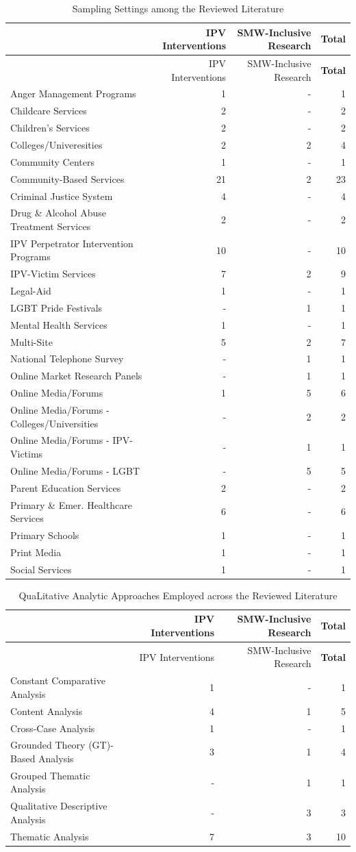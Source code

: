 \documentclass[11pt,]{tufte-book}
\begin{document}
\newpage

\begin{longtable}[]{@{}lrrr@{}}
\caption{Sampling Settings among the Reviewed Literature
\label{tbl:ftmsetp}}\tabularnewline
\toprule
& IPV Interventions & SMW-Inclusive Research &
\textbf{Total}\tabularnewline
\midrule
\endfirsthead
\toprule
& IPV Interventions & SMW-Inclusive Research &
\textbf{Total}\tabularnewline
\midrule
\endhead
Anger Management Programs & 1 & - & 1\tabularnewline
Childcare Services & 2 & - & 2\tabularnewline
Children's Services & 2 & - & 2\tabularnewline
Colleges/Univeresities & 2 & 2 & 4\tabularnewline
Community Centers & 1 & - & 1\tabularnewline
Community-Based Services & 21 & 2 & 23\tabularnewline
Criminal Justice System & 4 & - & 4\tabularnewline
Drug \& Alcohol Abuse Treatment Services & 2 & - & 2\tabularnewline
IPV Perpetrator Intervention Programs & 10 & - & 10\tabularnewline
IPV-Victim Services & 7 & 2 & 9\tabularnewline
Legal-Aid & 1 & - & 1\tabularnewline
LGBT Pride Festivals & - & 1 & 1\tabularnewline
Mental Health Services & 1 & - & 1\tabularnewline
Multi-Site & 5 & 2 & 7\tabularnewline
National Telephone Survey & - & 1 & 1\tabularnewline
Online Market Research Panels & - & 1 & 1\tabularnewline
Online Media/Forums & 1 & 5 & 6\tabularnewline
Online Media/Forums - Colleges/Universities & - & 2 & 2\tabularnewline
Online Media/Forums - IPV-Victims & - & 1 & 1\tabularnewline
Online Media/Forums - LGBT & - & 5 & 5\tabularnewline
Parent Education Services & 2 & - & 2\tabularnewline
Primary \& Emer. Healthcare Services & 6 & - & 6\tabularnewline
Primary Schools & 1 & - & 1\tabularnewline
Print Media & 1 & - & 1\tabularnewline
Social Services & 1 & - & 1\tabularnewline
\bottomrule
\end{longtable}

\newpage

\begin{longtable}[]{@{}lrrr@{}}
\caption{QuaLitative Analytic Approaches Employed across the Reviewed
Literature \label{tbl:aql}}\tabularnewline
\toprule
& IPV Interventions & SMW-Inclusive Research &
\textbf{Total}\tabularnewline
\midrule
\endfirsthead
\toprule
& IPV Interventions & SMW-Inclusive Research &
\textbf{Total}\tabularnewline
\midrule
\endhead
Constant Comparative Analysis & 1 & - & 1\tabularnewline
Content Analysis & 4 & 1 & 5\tabularnewline
Cross-Case Analysis & 1 & - & 1\tabularnewline
Grounded Theory (GT)-Based Analysis & 3 & 1 & 4\tabularnewline
Grouped Thematic Analysis & - & 1 & 1\tabularnewline
Qualitative Descriptive Analysis & - & 3 & 3\tabularnewline
Thematic Analysis & 7 & 3 & 10\tabularnewline
\bottomrule
\end{longtable}
\end{document}
